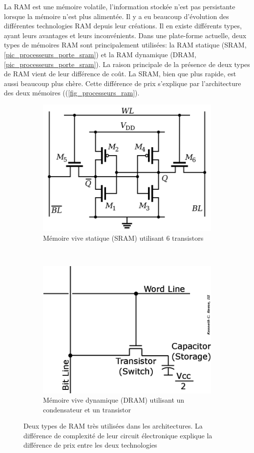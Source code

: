 La RAM est une mémoire volatile, l'information stockée n'est pas persistante lorsque la mémoire n'est plus alimentée. Il y a eu beaucoup d'évolution des différentes technologies RAM depuis leur créations. Il en existe différents types, ayant leurs avantages et leurs inconvénients. Dans une plate-forme actuelle, deux types de mémoires RAM sont principalement utilisées: la RAM statique (SRAM, \autoref{pic_processeurs_porte_sram}) et la RAM dynamique (DRAM, \autoref{pic_processeurs_porte_sram}). La raison principale de la présence de deux types de RAM vient de leur différence de coût. La SRAM, bien que plus rapide, est aussi beaucoup plus chère. Cette différence de prix s'explique par l'architecture des deux mémoires ((\autoref{fig_processeurs_ram}).


\begin{figure}
    \begin{subfigure}[]{0.48\linewidth}\centering
        \includegraphics[width=0.60\linewidth]{images/processeurs_porte_sram.png}
        \caption{Mémoire vive statique (SRAM) utilisant 6 transistors}
        \label{pic_processeurs_porte_sram}
    \end{subfigure}
    ~ %
    \begin{subfigure}[]{0.48\linewidth}\centering
        \includegraphics[width=0.60\linewidth]{images/processeurs_porte_dram.png}
        \caption{Mémoire vive dynamique (DRAM) utilisant un condensateur et un transistor}
        \label{pic_processeurs_porte_sram}
    \end{subfigure}
    \caption{Deux types de RAM très utilisées dans les architectures. La différence de complexité de leur circuit électronique explique la différence de prix entre les deux technologies}
    \label{fig_processeurs_ram}
\end{figure}


